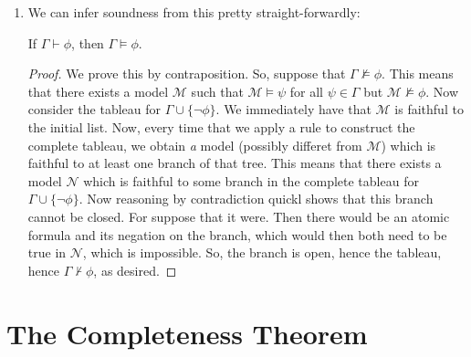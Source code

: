 \begin{enumerate}[{\thesection}.1]
                  \item We can infer soundness from this pretty
                    straight-forwardly:

                    \begin{theorem} If $\Gamma\vdash\phi$, then $\Gamma\vDash\phi$.
                      
                    \end{theorem}
                    \begin{proof}
                      We prove this by contraposition. So, suppose
                      that $\Gamma\nvDash\phi$. This means that there
                      exists a model $\mathcal{M}$  such that
                      $\mathcal{M}\vDash \psi$ for all $\psi\in\Gamma$ but
                      $\mathcal{M}\nvDash\phi$. Now consider
                      the tableau for $\Gamma\cup\{\neg\phi\}$. We
                      immediately have that $\mathcal{M}$ is faithful
                      to the initial list. Now, every time that we
                      apply a rule to construct the complete tableau,
                      we obtain \emph{a} model (possibly
                      differet from $\mathcal{M}$) which is
                      faithful to at least one branch of that
                      tree. This means that there exists a model
                      $\mathcal{N}$ which is faithful to some branch
                      in the complete tableau for
                      $\Gamma\cup\{\neg\phi\}$. Now reasoning by
                      contradiction quickl shows that this branch
                      cannot be closed. For suppose that it were. Then
                      there would be an atomic formula and its
                      negation on the branch, which would then both
                      need to be true in $\mathcal{N}$, which is
                      impossible. So, the branch is open, hence the
                      tableau, hence $\Gamma\nvdash\phi$, as desired. 
                    \end{proof}

				
	\end{enumerate}


\section{The Completeness  Theorem}

